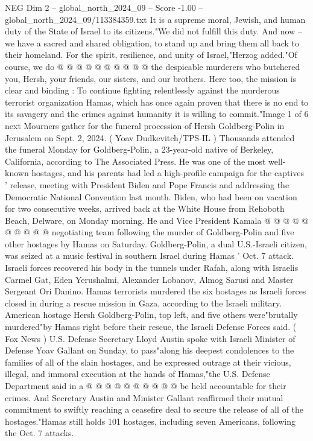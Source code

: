 \begin{textsample}{NEG Dim 2 – global\_north\_2024\_09 – Score -1.00 – global\_north\_2024\_09/113384359.txt}
It is a supreme moral, Jewish, and human duty of the State of Israel to its citizens."We did not fulfill this duty.
And now -- we have a sacred and shared obligation, to stand up and bring them all back to their homeland.
For the spirit, resilience, and unity of Israel,"Herzog added."Of course, we do @ @ @ @ @ @ @ @ @ @ the despicable murderers who butchered you, Hersh, your friends, our sisters, and our brothers.
Here too, the mission is clear and binding : To continue fighting relentlessly against the murderous terrorist organization Hamas, which has once again proven that there is no end to its savagery and the crimes against humanity it is willing to commit."Image 1 of 6 next Mourners gather for the funeral procession of Hersh Goldberg-Polin in Jerusalem on Sept. 2, 2024. ( Yoav Dudkevitch/TPS-IL ) Thousands attended the funeral Monday for Goldberg-Polin, a 23-year-old native of Berkeley, California, according to The Associated Press.
He was one of the most well-known hostages, and his parents had led a high-profile campaign for the captives ' release, meeting with President Biden and Pope Francis and addressing the Democratic National Convention last month.
Biden, who had been on vacation for two consecutive weeks, arrived back at the White House from Rehoboth Beach, Delware, on Monday morning.
He and Vice President Kamala @ @ @ @ @ @ @ @ @ @ negotiating team following the murder of Goldberg-Polin and five other hostages by Hamas on Saturday.
Goldberg-Polin, a dual U.S.-Israeli citizen, was seized at a music festival in southern Israel during Hamas ' Oct. 7 attack.
Israeli forces recovered his body in the tunnels under Rafah, along with Israelis Carmel Gat, Eden Yerushalmi, Alexander Lobanov, Almog Sarusi and Master Sergeant Ori Danino.
Hamas terrorists murdered the six hostages as Israeli forces closed in during a rescue mission in Gaza, according to the Israeli military.
American hostage Hersh Goldberg-Polin, top left, and five others were"brutally murdered"by Hamas right before their rescue, the Israeli Defense Forces said. ( Fox News ) U.S.
Defense Secretary Lloyd Austin spoke with Israeli Minister of Defense Yoav Gallant on Sunday, to pass"along his deepest condolences to the families of all of the slain hostages, and he expressed outrage at their vicious, illegal, and immoral execution at the hands of Hamas,"the U.S.
Defense Department said in a @ @ @ @ @ @ @ @ @ @ be held accountable for their crimes.
And Secretary Austin and Minister Gallant reaffirmed their mutual commitment to swiftly reaching a ceasefire deal to secure the release of all of the hostages."Hamas still holds 101 hostages, including seven Americans, following the Oct. 7 attacks.

\end{textsample}
